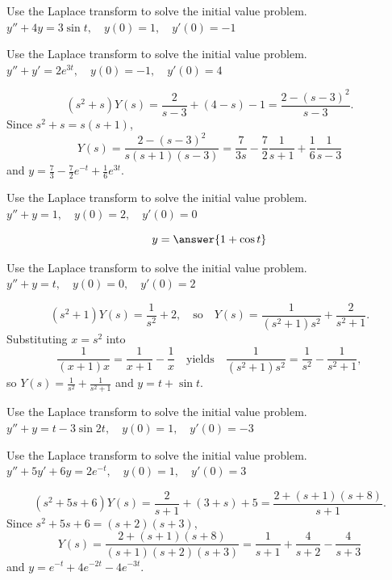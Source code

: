 \documentclass{ximera}
\begin{document}
\begin{problem}\label{exer:8.3.17} Use the Laplace transform to solve the initial value problem. $y''+4y=3\sin t, \quad  y(0)=1,\quad y'(0)=-1$
\end{problem}

\begin{problem}\label{exer:8.3.18} Use the Laplace transform to solve the initial value problem. $y''+y'=2e^{3t}, \quad  y(0)=-1,\quad y'(0)=4$

\begin{solution}
$$
(s^2+s)Y(s)=\frac{2}{s-3}+(4-s)-1=\frac{2-(s-3)^2}{s-3}.
$$
Since $s^2+s=s(s+1)$,
$$
Y(s)=\frac{2-(s-3)^2}{s(s+1)(s-3)}=\frac{7}{3s}-\frac{7}{2}\frac{1}{s+1}
+\frac{1}{6}\frac{1}{s-3}
$$
and $y=\frac{7}{3}-\frac{7}{2}e^{-t} +\frac{1}{6}e^{3t}$.
\end{solution}
\end{problem}

\begin{problem}\label{exer:8.3.19} Use the Laplace transform to solve the initial value problem. $y''+y=1, \quad  y(0)=2,\quad y'(0)=0$

$$y=\answer{1+\cos{t}}$$

\end{problem}

\begin{problem}\label{exer:8.3.20} Use the Laplace transform to solve the initial value problem. $y''+y=t, \quad  y(0)=0,\quad y'(0)=2$

\begin{solution}
$$
(s^2+1)Y(s)=\frac{1}{s^2}+2,\quad \mbox{so}\quad
Y(s)=\frac{1}{(s^2+1)s^2}+\frac{2}{s^2+1}.
$$
Substituting $x=s^2$ into
$$
\frac{1}{(x+1)x}=\frac{1}{x+1}-\frac{1}{x}
\quad \mbox{yields}\quad
\frac{1}{(s^2+1)s^2}=\frac{1}{s^2}-\frac{1}{s^2+1},
$$
so $Y(s)=\frac{1}{s^2}+\frac{1}{s^2+1}$ and $y=t+\sin t$.
\end{solution}
\end{problem}

\begin{problem}\label{exer:8.3.21} Use the Laplace transform to solve the initial value problem. $y''+y=t-3\sin2t, \quad  y(0)=1,\quad y'(0)=-3$
\end{problem}

\begin{problem}\label{exer:8.3.22} Use the Laplace transform to solve the initial value problem. $y''+5y'+6y=2e^{-t}, \quad  y(0)=1,\quad y'(0)=3$

\begin{solution}
$$
 (s^2+5s+6)Y(s)=\frac{2}{s+1}+(3+s)+5=\frac{2+(s+1)(s+8)}{s+1}.
$$
Since $s^2+5s+6=(s+2)(s+3)$,
$$
Y(s)=\frac{2+(s+1)(s+8)}{(s+1)(s+2)(s+3)}=
\frac{1}{s+1}+\frac{4}{s+2}-\frac{4}{s+3}
$$
and
 $y=e^{-t}+4e^{-2t}-4e^{-3t}$.
\end{solution}
\end{problem}
\end{document}
